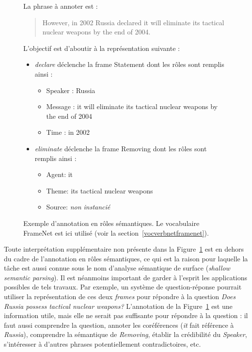 \begin{figure}[t]
    La phrase à annoter est :

    \begin{quote}
    However, in 2002 Russia declared it will eliminate its tactical nuclear weapons by the end of 2004.
    \end{quote}

    L'objectif est d'aboutir à la représentation suivante :

    \begin{itemize}
        \item \textit{declare} déclenche la frame Statement dont les rôles sont remplis ainsi :
        \begin{itemize}
            \item Speaker : Russia
            \item Message : it will eliminate its tactical nuclear weapons by the end of 2004
            \item Time : in 2002
        \end{itemize}
        \item \textit{eliminate} déclenche la frame Removing dont les rôles sont remplis ainsi :
        \begin{itemize}
            \item Agent: it
            \item Theme: its tactical nuclear weapons
            \item Source: \textit{non instancié}
        \end{itemize}
    \end{itemize}
    \caption{\label{fig:srlrussia}Exemple d'annotation en rôles sémantiques. Le
    vocabulaire FrameNet est ici utilisé (voir la
section~\ref{vocverbnetframenet}).}

\end{figure}

Toute interprétation supplémentaire non présente dans la
Figure~\ref{fig:srlrussia} est en dehors du cadre de l'annotation en rôles
sémantiques, ce qui est la raison pour laquelle la tâche est aussi connue sous
le nom d'analyse sémantique de surface (\textit{shallow semantic parsing}). Il
est néanmoins important de garder à l'esprit les applications possibles de tels
travaux. Par exemple, un système de question-réponse pourrait utiliser la
représentation de ces deux \textit{frames} pour répondre à la question
\textit{Does Russia possess tactical nuclear weapons?} L'annotation de la
Figure~\ref{fig:srlrussia} est une information utile, mais elle ne serait pas
suffisante pour répondre à la question : il faut aussi comprendre la question,
annoter les coréférences (\textit{it} fait référence à \textit{Russia}),
comprendre la sémantique de \textit{Removing}, établir la crédibilité du
\textit{Speaker}, s'intéresser à d'autres phrases potentiellement
contradictoires, etc.

